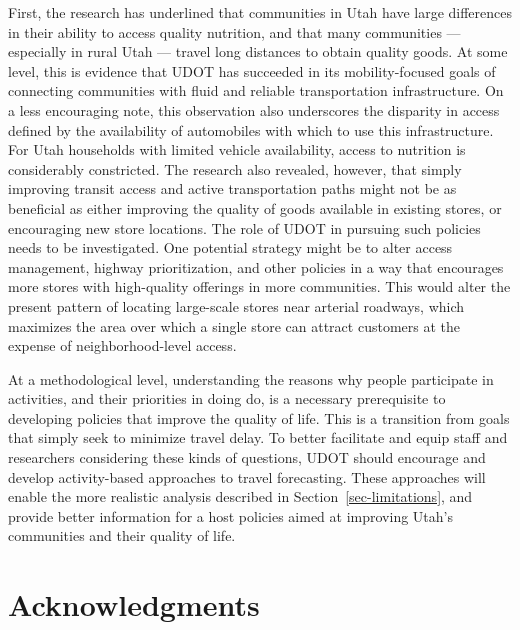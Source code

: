\documentclass[
  letterpaper,
  DIV=11,
  numbers=noendperiod]{scrreport}
\begin{document}
First, the research has underlined that communities in Utah have large
differences in their ability to access quality nutrition, and that many
communities --- especially in rural Utah --- travel long distances to
obtain quality goods. At some level, this is evidence that UDOT has
succeeded in its mobility-focused goals of connecting communities with
fluid and reliable transportation infrastructure. On a less encouraging
note, this observation also underscores the disparity in access defined
by the availability of automobiles with which to use this
infrastructure. For Utah households with limited vehicle availability,
access to nutrition is considerably constricted. The research also
revealed, however, that simply improving transit access and active
transportation paths might not be as beneficial as either improving the
quality of goods available in existing stores, or encouraging new store
locations. The role of UDOT in pursuing such policies needs to be
investigated. One potential strategy might be to alter access
management, highway prioritization, and other policies in a way that
encourages more stores with high-quality offerings in more communities.
This would alter the present pattern of locating large-scale stores near
arterial roadways, which maximizes the area over which a single store
can attract customers at the expense of neighborhood-level access.

At a methodological level, understanding the reasons why people
participate in activities, and their priorities in doing do, is a
necessary prerequisite to developing policies that improve the quality
of life. This is a transition from goals that simply seek to minimize
travel delay. To better facilitate and equip staff and researchers
considering these kinds of questions, UDOT should encourage and develop
activity-based approaches to travel forecasting. These approaches will
enable the more realistic analysis described in
Section~\ref{sec-limitations}, and provide better information for a host
policies aimed at improving Utah's communities and their quality of
life.


\hypertarget{acknowledgments}{%
\chapter*{Acknowledgments}\label{acknowledgments}}

\end{document}
